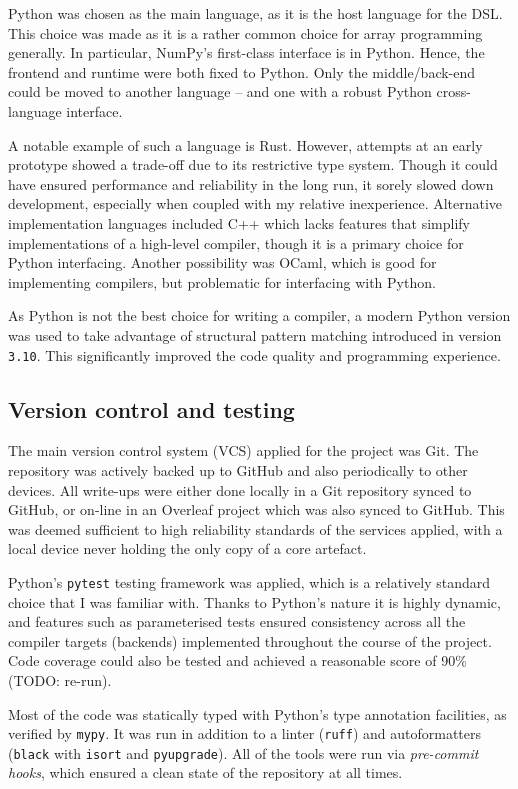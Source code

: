 Python was chosen as the main language, as it is the host language for the DSL. This choice was made as it is a rather common choice for array programming generally. In particular, NumPy's first-class interface is in Python. Hence, the frontend and runtime were both fixed to Python. Only the middle/back-end could be moved to another language -- and one with a robust Python cross-language interface. 

A notable example of such a language is Rust. However, attempts at an early prototype showed a trade-off due to its restrictive type system. Though it could have ensured performance and reliability in the long run, it sorely slowed down development, especially when coupled with my relative inexperience. Alternative implementation languages included C++ which lacks features that simplify implementations of a high-level compiler, though it is a primary choice for Python interfacing. Another possibility was OCaml, which is good for implementing compilers, but problematic for interfacing with Python. 

As Python is not the best choice for writing a compiler, a modern Python version was used to take advantage of structural pattern matching introduced in version \texttt{3.10}. This significantly improved the code quality and programming experience. 

\subsection{Version control and testing}

The main version control system (VCS) applied for the project was Git. The repository was actively backed up to GitHub and also periodically to other devices. All write-ups were either done locally in a Git repository synced to GitHub, or on-line in an Overleaf project which was also synced to GitHub. This was deemed sufficient to high reliability standards of the services applied, with a local device never holding the only copy of a core artefact. 

Python's \texttt{pytest} testing framework was applied, which is a relatively standard choice that I was familiar with. Thanks to Python's nature it is highly dynamic, and features such as parameterised tests ensured consistency across all the compiler targets (backends) implemented throughout the course of the project. Code coverage could also be tested and achieved a reasonable score of 90\% (TODO: re-run).

Most of the code was statically typed with Python's type annotation facilities, as verified by \texttt{mypy}. It was run in addition to a linter (\texttt{ruff}) and autoformatters (\texttt{black} with \texttt{isort} and \texttt{pyupgrade}). All of the tools were run via \textit{pre-commit hooks}, which ensured a clean state of the repository at all times.

